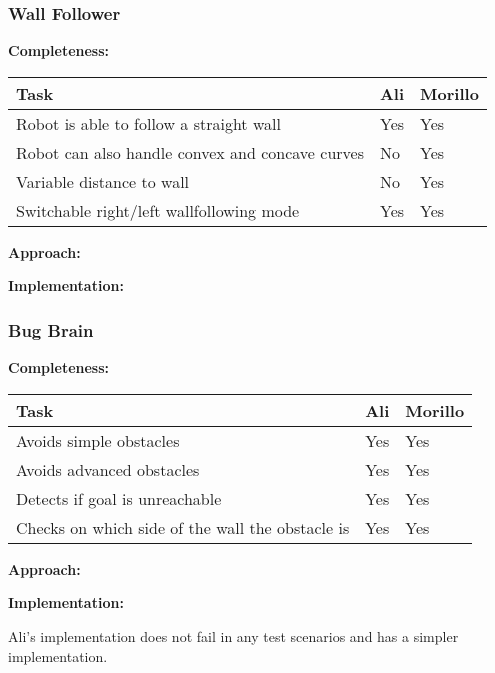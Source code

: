 \documentclass{beamer}
\begin{document}
\begin{frame}
  \frametitle{Wall Follower}


 \textbf{Completeness:}
    \begin{center}
      \begin{tabular}{| p{4cm} | p{2.7cm} | p{2.7cm} | }
      \hline
	\textbf{Task}  & \textbf{Ali} & \textbf{Morillo}\\ \hline
	Robot is able to follow a straight wall & Yes & Yes\\  \hline
	Robot can also handle convex and concave curves & No & Yes\\  \hline
	Variable distance to wall & No & Yes\\  \hline
	Switchable right/left wallfollowing mode & Yes & Yes\\  \hline
      \end{tabular}
  \end{center}
  \textbf{Approach:}
  \begin{center}
  \end{center}
  
  \textbf{Implementation:}
  \begin{center}
  \end{center}
\end{frame}


\begin{frame}
  \frametitle{Bug Brain}


 \textbf{Completeness:}
    \begin{center}
      \begin{tabular}{| p{4cm} | p{2.7cm} | p{2.7cm} | }
      \hline
	\textbf{Task}  & \textbf{Ali} & \textbf{Morillo}\\ \hline
	Avoids simple obstacles & Yes & Yes\\  \hline
	Avoids advanced obstacles & Yes & Yes\\  \hline
	Detects if goal is unreachable & Yes & Yes\\  \hline
	Checks on which side of the wall the obstacle is & Yes & Yes\\  \hline
      \end{tabular}
  \end{center}
  \textbf{Approach:}
  \begin{center}
  \end{center}
  
  \textbf{Implementation:}
  \begin{center}
   Ali's implementation does not fail in any test scenarios and has a simpler implementation.
  \end{center}
\end{frame}
\end{document}

